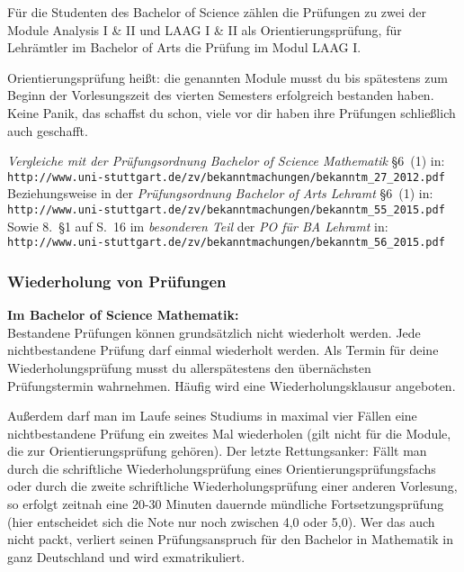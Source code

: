 Für die Studenten des Bachelor of Science
zählen die Prüfungen zu zwei der Module Analysis I \& II
und LAAG I \& II als Orientierungsprüfung,
für Lehrämtler im Bachelor of Arts die Prüfung im Modul LAAG I.

Orientierungsprüfung heißt: die genannten Module
musst du bis spätestens zum Beginn der Vorlesungszeit
des vierten Semesters erfolgreich bestanden haben.
Keine Panik, das schaffst du schon,
viele vor dir haben ihre Prüfungen
schließlich auch geschafft.

{\it Vergleiche mit der Prüfungsordnung Bachelor of Science Mathematik} §6~(1) in:\\
{\small
\verb|http://www.uni-stuttgart.de/zv/bekanntmachungen/bekanntm_27_2012.pdf|}\\
Beziehungsweise in der {\it Prüfungsordnung Bachelor of Arts Lehramt} §6~(1) in:\\
{\small
\verb|http://www.uni-stuttgart.de/zv/bekanntmachungen/bekanntm_55_2015.pdf|}\\
Sowie 8.~§1 auf S.\ 16 im {\it besonderen Teil} der {\it PO für BA Lehramt} in:\\
{\small
\verb|http://www.uni-stuttgart.de/zv/bekanntmachungen/bekanntm_56_2015.pdf|}

\subsubsection{Wiederholung von Prüfungen}\label{sssec:wi}

{\bf Im Bachelor of Science Mathematik:}\\
Bestandene Prüfungen können grundsätzlich nicht wiederholt werden.
Jede nichtbestandene Prüfung darf einmal wiederholt werden.
Als Termin für deine Wiederholungsprüfung
musst du allerspätestens den übernächsten Prüfungstermin wahrnehmen.
Häufig wird eine Wiederholungsklausur angeboten.

Außerdem darf man im Laufe seines Studiums
in maximal vier Fällen eine nichtbestandene Prüfung
ein zweites Mal wiederholen (gilt nicht für die Module,
die zur Orientierungsprüfung gehören).
Der letzte Rettungsanker:
Fällt man durch die schriftliche Wiederholungsprüfung
eines Orientierungsprüfungsfachs
oder durch die zweite schriftliche Wiederholungsprüfung
einer anderen Vorlesung, so erfolgt zeitnah eine 20-30 Minuten
dauernde mündliche Fortsetzungsprüfung (hier entscheidet sich die Note
nur noch zwischen 4,0 oder 5,0).
Wer das auch nicht packt, verliert seinen Prüfungsanspruch
für den Bachelor in Mathematik
in ganz Deutschland und wird exmatrikuliert.

